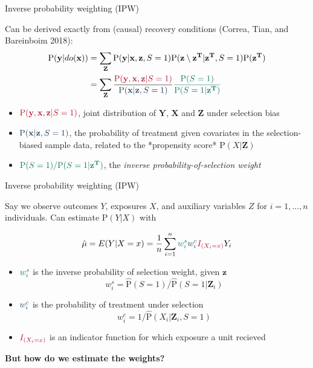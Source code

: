 \documentclass[
  ignorenonframetext,
]{beamer}
\providecommand{\tightlist}{%
  \setlength{\itemsep}{0pt}\setlength{\parskip}{0pt}}
\begin{document}
\begin{frame}{Inverse probability weighting (IPW)}
\protect\hypertarget{inverse-probability-weighting-ipw}{}

Can be derived exactly from (causal) recovery conditions (Correa, Tian,
and Bareinboim 2018): \begin{align}
\text{P}(\mathbf{y}|do(\mathbf{x})) &= \sum_\mathbf{Z} \text{P}(\mathbf{y}|\mathbf{x}, \mathbf{z}, S=1)\text{P}(\mathbf{z}\setminus\mathbf{z^T}|\mathbf{z^T}, S = 1)\text{P}(\mathbf{z^T})\\
&= \sum_\mathbf{Z} \frac{\textcolor{oxfordred}{\text{P}(\mathbf{y}, \mathbf{x}, \mathbf{z} | S = 1)}}{\textcolor{oxfordlightblue}{\text{P}(\mathbf{x}| \mathbf{z}, S = 1)}} \textcolor{oxfordgreen}{\frac{\text{P}(S = 1)}{\text{P}(S = 1 | \mathbf{z^T})}} \label{eq:IPSW}
\end{align}

\begin{itemize}
    \item  $\textcolor{oxfordred}{\text{P}(\mathbf{y}, \mathbf{x}, \mathbf{z} | S = 1)}$, joint distribution of $\mathbf{Y}$, $\mathbf{X}$ and $\mathbf{Z}$ under selection bias
    \item $\textcolor{oxfordlightblue}{\text{P}(\mathbf{x}| \mathbf{z}, S = 1)}$, the probability of treatment given covariates in the selection-biased sample data, related to the *propensity score* $\text{P}(X|\mathbf{Z})$
    \item $\textcolor{oxfordgreen}{\text{P}(S = 1)/\text{P}(S = 1 | \mathbf{z^T})}$, the \textit{inverse probability-of-selection weight}
\end{itemize}

\end{frame}

\begin{frame}{Inverse probability weighting (IPW)}
\protect\hypertarget{inverse-probability-weighting-ipw-1}{}

Say we observe outcomes \(Y\), exposures \(X\), and auxiliary variables
\(Z\) for \(i = 1, \dots, n\) individuals. Can estimate
\(\text{P}(Y | X)\) with

\[\hat{\mu} = E(Y | X = x) = \frac{1}{n}\sum_{i = 1}^n \textcolor{oxfordgreen}{w_i^s} \textcolor{oxfordlightblue}{w_i^c} \textcolor{oxfordred}{I_{(X_i = x)}}Y_i\]

\begin{itemize}
\tightlist
\item
  \(\textcolor{oxfordgreen}{w_i^{s}}\) is the inverse probability of
  selection weight, given \(\mathbf{z}\)
  \[w_i^{s} = \hat{\text{P}}(S = 1)/\hat{\text{P}}(S = 1 | \mathbf{Z}_i)\]
\item
  \(\textcolor{oxfordlightblue}{w_i^c}\) is the probability of treatment
  under selection \[w_i^c = 1/\hat{\text{P}}(X_i|\mathbf{Z}_i, S = 1)\]
\item
  \(\textcolor{oxfordred}{I_{(X_i = x)}}\) is an indicator function for
  which exposure a unit recieved
\end{itemize}

\textbf{But how do we estimate the weights?}

\end{frame}
\end{document}
